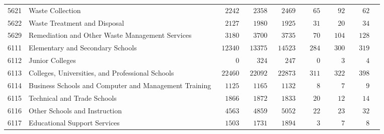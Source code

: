 \documentclass[9pt, oneside]{article}   	%
\begin{document}
\begin{longtable}{lp{3 in}ccccccc}
5621  & Waste Collection & $\phantom{00}2242$ & $\phantom{00}2358$ & $\phantom{00}2469$ & $\phantom{000}65$ & $\phantom{000}92$ & $\phantom{000}62$ \\
5622  & Waste Treatment and Disposal & $\phantom{00}2127$ & $\phantom{00}1980$ & $\phantom{00}1925$ & $\phantom{000}31$ & $\phantom{000}20$ & $\phantom{000}34$ \\
5629  & Remediation and Other Waste Management Services & $\phantom{00}3180$ & $\phantom{00}3700$ & $\phantom{00}3735$ & $\phantom{000}70$ & $\phantom{00}104$ & $\phantom{00}128$ \\
6111  & Elementary and Secondary Schools & $\phantom{0}12340$ & $\phantom{0}13375$ & $\phantom{0}14523$ & $\phantom{00}284$ & $\phantom{00}300$ & $\phantom{00}319$ \\
6112  & Junior Colleges & $\phantom{00000}0$ & $\phantom{000}324$ & $\phantom{000}247$ & $\phantom{0000}0$ & $\phantom{0000}3$ & $\phantom{0000}4$ \\
6113  & Colleges, Universities, and Professional Schools & $\phantom{0}22460$ & $\phantom{0}22092$ & $\phantom{0}22873$ & $\phantom{00}311$ & $\phantom{00}322$ & $\phantom{00}398$ \\
6114  & Business Schools and Computer and Management Training & $\phantom{00}1125$ & $\phantom{00}1165$ & $\phantom{00}1132$ & $\phantom{0000}8$ & $\phantom{0000}7$ & $\phantom{0000}9$ \\
6115  & Technical and Trade Schools & $\phantom{00}1866$ & $\phantom{00}1872$ & $\phantom{00}1833$ & $\phantom{000}20$ & $\phantom{000}12$ & $\phantom{000}14$ \\
6116  & Other Schools and Instruction & $\phantom{00}4563$ & $\phantom{00}4859$ & $\phantom{00}5052$ & $\phantom{000}22$ & $\phantom{000}23$ & $\phantom{000}32$ \\
6117  & Educational Support Services & $\phantom{00}1503$ & $\phantom{00}1731$ & $\phantom{00}1894$ & $\phantom{0000}3$ & $\phantom{0000}7$ & $\phantom{0000}8$ \\


\end{longtable}
\end{document}
